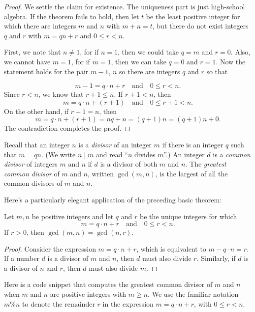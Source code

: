 \begin{proof} 
We settle the claim for existence.  The uniqueness part is
just high-school algebra.  If the theorem fails to hold, then
let $t$ be the least positive integer for which there are
integers $m$ and $n$ with $m+n=t$, but there
do not exist integers $q$ and $r$ with $m=qn+r$ and $0\le r<n$.

First, we note that $n\neq 1$, for if $n=1$, then we could take
$q=m$ and $r=0$.  Also, we cannot have $m=1$, for if $m=1$, then
we can take $q=0$ and $r=1$.  Now the statement holds for the
pair $m-1$, $n$ so there are integers $q$ and $r$ so that

\[
m-1 = q\cdot n+r\quad\text{and}\quad 0 \le r < n.
\]
Since $r<n$, we know that $r+1\le n$.  If $r+1<n$, then
\[
m = q\cdot n+(r+1)\quad\text{and}\quad 0 \le r+1 < n.
\]
On the other hand, if $r+1=n$, then
\[
m = q\cdot n+(r+1)=nq+n=(q+1)n=(q+1)n+0.
\]
The contradiction completes the proof.
\end{proof}

Recall that an integer $n$ is a \emph{divisor} of an integer $m$ if
there is an integer $q$ such that $m=qn$. (We write $n\mid m$ and read
``$n$ divides $m$''.) An integer $d$ is a \emph{common divisor} of
integers $m$ and $n$ if $d$ is a divisor of both $m$ and $n$. The
\emph{greatest common divisor} of $m$ and $n$, written $\gcd(m,n)$, is
the largest of all the common divisors of $m$ and $n$.

Here's a particularly elegant application of the preceding basic
theorem:

\begin{theorem}\label{thm:euclideanalg}
Let $m,n$ be positive integers and let $q$ and $r$ be
the unique integers for which
\[
m = q\cdot n+r\quad\text{and}\quad 0 \le r < n.
\]
If $r>0$, then $\gcd(m,n)=\gcd(n,r)$.
\end{theorem}
\begin{proof}
  Consider the expression $m=q\cdot n+r$, which is equivalent to
  $m-q\cdot n = r$. If a number $d$ is a divisor
  of $m$ and $n$, then $d$ must also divide $r$.  Similarly, if $d$ is
  a divisor of $n$ and $r$, then $d$ must also divide $m$.
\end{proof}

Here is a code snippet that computes the greatest common divisor of
$m$ and $n$ when $m$ and $n$ are positive integers with $m\ge n$.  We
use the familiar notation $m\%n$ to denote the remainder $r$ in the
expression $m=q\cdot n+r$, with $0\le r < n$.

